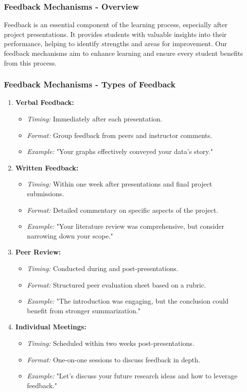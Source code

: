 \documentclass[aspectratio=169]{beamer}
\begin{document}
\begin{frame}[fragile]
  \frametitle{Feedback Mechanisms - Overview}
  Feedback is an essential component of the learning process, especially after project presentations. 
  It provides students with valuable insights into their performance, helping to identify strengths and areas for improvement.
  Our feedback mechanisms aim to enhance learning and ensure every student benefits from this process.
\end{frame}

\begin{frame}[fragile]
  \frametitle{Feedback Mechanisms - Types of Feedback}
  \begin{enumerate}
    \item \textbf{Verbal Feedback:}
      \begin{itemize}
        \item \textit{Timing:} Immediately after each presentation.
        \item \textit{Format:} Group feedback from peers and instructor comments.
        \item \textit{Example:} "Your graphs effectively conveyed your data’s story."
      \end{itemize}

    \item \textbf{Written Feedback:}
      \begin{itemize}
        \item \textit{Timing:} Within one week after presentations and final project submissions.
        \item \textit{Format:} Detailed commentary on specific aspects of the project.
        \item \textit{Example:} "Your literature review was comprehensive, but consider narrowing down your scope."
      \end{itemize}

    \item \textbf{Peer Review:}
      \begin{itemize}
        \item \textit{Timing:} Conducted during and post-presentations.
        \item \textit{Format:} Structured peer evaluation sheet based on a rubric.
        \item \textit{Example:} "The introduction was engaging, but the conclusion could benefit from stronger summarization."
      \end{itemize}

    \item \textbf{Individual Meetings:}
      \begin{itemize}
        \item \textit{Timing:} Scheduled within two weeks post-presentations.
        \item \textit{Format:} One-on-one sessions to discuss feedback in depth.
        \item \textit{Example:} "Let’s discuss your future research ideas and how to leverage feedback."
      \end{itemize}
  \end{enumerate}
\end{frame}
\end{document}
